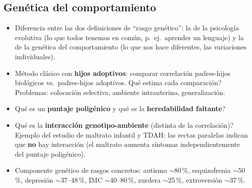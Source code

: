 \documentclass[11pt, a4paper]{article}
\begin{document}
\subsection*{Gen\'etica del comportamiento}
\begin{itemize}[nosep]
    \item Diferencia entre las dos definiciones de ``rasgo gen\'etico'': la de la psicolog\'ia evolutiva (lo que todos tenemos en com\'un, p.\ ej.\ aprender un lenguaje) y la de la gen\'etica del comportamiento (lo que nos hace diferentes, las variaciones individuales).
    \item M\'etodo cl\'asico con \textbf{hijos adoptivos}: comparar correlaci\'on padres-hijos biol\'ogicos vs.\ padres-hijos adoptivos. \textquestiondown Qu\'e estima cada comparaci\'on? Problemas: colocaci\'on selectiva, ambiente intrauterino, generalizaci\'on.
    \item \textquestiondown Qu\'e es un \textbf{puntaje polig\'enico} y qu\'e es la \textbf{heredabilidad faltante}?
    \item \textquestiondown Qu\'e es la \textbf{interacci\'on genotipo-ambiente} (distinta de la correlaci\'on)? Ejemplo del estudio de maltrato infantil y TDAH: las rectas paralelas indican que \textbf{no} hay interacci\'on (el maltrato aumenta s\'intomas independientemente del puntaje polig\'enico).
    \item Componente gen\'etico de rasgos concretos: autismo $\sim$80\,\%, esquizofrenia $\sim$50\,\%, depresi\'on $\sim$37--48\,\%, IMC $\sim$40--80\,\%, zurdera $\sim$25\,\%, extroversi\'on $\sim$37\,\%.
\end{itemize}
\end{document}
